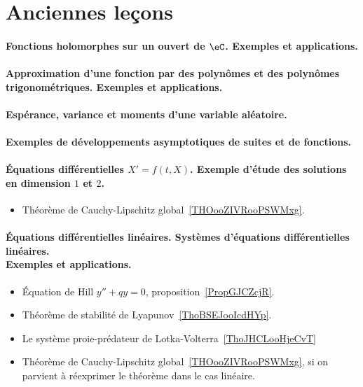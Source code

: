 \section{Anciennes leçons}

\paragraph{Fonctions holomorphes sur un ouvert de $\eC$. Exemples et applications.}
\paragraph{Approximation d'une fonction par des polynômes et des polynômes trigonométriques. Exemples et applications.}
\paragraph{Espérance, variance et moments d'une variable aléatoire.}
\paragraph{Exemples de développements asymptotiques de suites et de fonctions.}
\paragraph{Équations différentielles \( X'=f(t,X)\). Exemple d'étude des solutions en dimension \( 1\) et \( 2\).}
\begin{itemize}
    \item Théorème de Cauchy-Lipschitz global~\ref{THOooZIVRooPSWMxg}.
\end{itemize}
\paragraph{Équations différentielles linéaires. Systèmes d’équations différentielles linéaires.\\ Exemples et applications.}
\begin{itemize}
    \item Équation de Hill \( y''+qy=0\), proposition~\ref{PropGJCZcjR}.
    \item Théorème de stabilité de Lyapunov~\ref{ThoBSEJooIcdHYp}.
    \item Le système proie-prédateur de Lotka-Volterra~\ref{ThoJHCLooHjeCvT}
    \item Théorème de Cauchy-Lipschitz global~\ref{THOooZIVRooPSWMxg}, si on parvient à réexprimer le théorème dans le cas linéaire.
\end{itemize}
